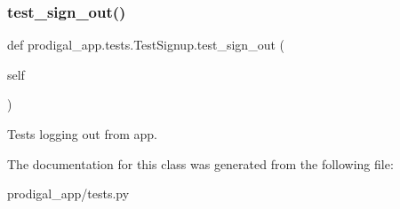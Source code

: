 \subsubsection{\texorpdfstring{test\+\_\+sign\+\_\+out()}{test\_sign\_out()}}
{\footnotesize\ttfamily def prodigal\+\_\+app.\+tests.\+Test\+Signup.\+test\+\_\+sign\+\_\+out (\begin{DoxyParamCaption}\item[{}]{self }\end{DoxyParamCaption})}

\begin{DoxyVerb}Tests logging out from app.
\end{DoxyVerb}
 

The documentation for this class was generated from the following file\+:\begin{DoxyCompactItemize}
\item 
prodigal\+\_\+app/tests.\+py\end{DoxyCompactItemize}
